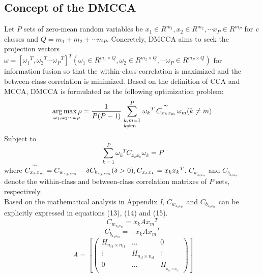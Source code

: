 \documentclass[journal]{IEEEtran}
\begin{document}
\subsection{Concept of the DMCCA}
Let \emph{$ P $} sets of zero-mean random variables be ${x_1} \in {R^{{m_1}}},{x_2} \in {R^{{m_2}}}, \cdots {x_P} \in {R^{{m_P}}}$ for \emph{c} classes and $Q = {m_1} + {m_2} +  \cdots {m_P}$. Concretely, DMCCA aims to seek the projection vectors $\omega  = {[{\omega _1}^T,{\omega _2}^T \cdots {\omega _P}^T]^T} ({\omega _1} \in {R^{{m_1} \times Q}},{\omega _2} \in {R^{{m_2} \times Q}}, \cdots {\omega _P} \in {R^{{m_P} \times Q}})$ for information fusion so that the within-class correlation is maximized and the between-class correlation is minimized. Based on the definition of CCA and MCCA, DMCCA is formulated as the following optimization problem:
\begin{equation} \mathop {\arg \max \rho }\limits_{{\omega _1},{\omega _2} \cdots {\omega _P}}  = \frac{1}{{P(P - 1)}}\sum\limits_{\scriptstyle k,m = 1\hfill\atop \scriptstyle{\rm{ }}k \ne m\hfill}^P {{\omega _k}^T\mathop {{C_{{x_k}{x_m}}}}\limits^ \sim  {\omega _m}} {\rm{  (}}k \ne m{\rm{)}} \end{equation}
Subject to
\begin{equation} \sum\limits_{k = 1}^P {{\omega _k}^T{C_{{x_k}{x_k}}}{\omega _k}}  = P \end{equation}
where $\mathop {{C_{{x_k}{x_m}}}}\limits^ \sim   = {C_{{w_{{x_k}{x_m}}}}} - \delta {C_{{b_{{x_k}{x_m}}}}}(\delta  > 0),{\rm{ }}{C_{{x_k}{x_k}}} = {x_k}{x_k}^T$. ${C_{{w_{{x_k}{x_m}}}}}$ and ${C_{{b_{{x_k}{x_m}}}}}$ denote the within-class and between-class correlation matrixes of \emph{$ P $} sets, respectively. \\\indent
Based on the mathematical analysis in Appendix \emph{I}, $C_{{w_{{x_k}{x_m}}}}$ and $C_{{b_{{x_k}{x_m}}}}$ can be explicitly expressed in equations (13), (14) and (15).
\begin{equation}
{C_{{w_{{x_k}{x_m}}}}} = {x_k}A{x_m}^T
\end{equation}
\begin{equation}
{C_{{b_{{x_k}{x_m}}}}} = - {x_k}A{x_m}^T
\end{equation}
\begin{equation} \ A = \left[ {\left( {\begin{array}{*{20}{c}}{{H_{{n_{i1}} \times {n_{i1}}}}}& \ldots &0\\
 \vdots &{{H_{{n_{il}} \times {n_{il}}}}}& \vdots \\
0& \ldots &{{H_{_{{n_{ic}} \times {n_{ic}}}}}}
\end{array}} \right)} \right]  \end{equation}
\end{document}
